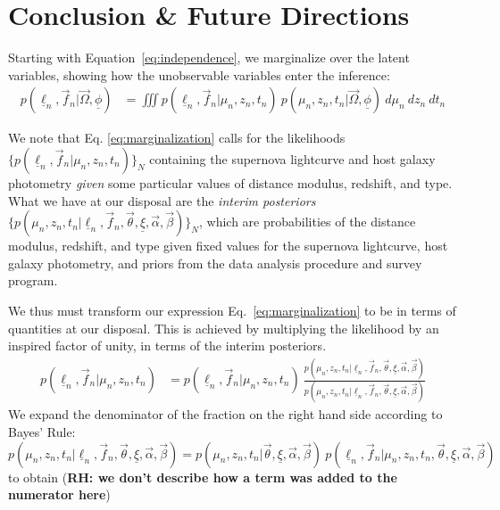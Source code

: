 \documentclass[12pt, twocolumn]{emulateapj}
\newcommand{\textul}{\underline}
\begin{document}
\section{Conclusion \& Future Directions}
\label{sec:conclusion}


\clearpage



\clearpage

\begin{appendix}
\label{appendix:derivation}

Starting with Equation~\ref{eq:independence}, we marginalize over the latent variables, showing how the unobservable variables enter the inference:
\begin{align}
\label{eq:marginalization}
p(\textul{\ell}_{n}, \vec{f}_{n} | \vec{\Omega}, \textul{\phi}) &= \iiint p(\textul{\ell}_{n}, \vec{f}_{n} | \mu_{n}, z_{n}, t_{n})\ p(\mu_{n}, z_{n}, t_{n} | \vec{\Omega}, \textul{\phi})\ d\mu_{n}\ dz_{n}\ dt_{n}
\end{align}
 
  We note that Eq. \ref{eq:marginalization} calls for the likelihoods $\{p(\textul{\ell}_{n}, \vec{f}_{n} | \mu_{n}, z_{n}, t_{n})\}_{N}$ containing the supernova lightcurve and host galaxy photometry \textit{given} some particular values of distance modulus, redshift, and type. 
  What we have at our disposal are the \textit{interim posteriors}  $\{p(\mu_{n}, z_{n}, t_{n} | \textul{\ell}_{n}, \vec{f}_{n}, \vec{\theta}, \textul{\xi}, \vec{\alpha}, \vec{\beta})\}_{N}$, which are probabilities of the distance modulus, redshift, and type given fixed values for the supernova lightcurve, host galaxy photometry, and priors from the data analysis procedure and survey program.

We thus must transform our expression Eq.~\ref{eq:marginalization} to be in terms of quantities at our disposal. 
This is achieved by multiplying the likelihood by an inspired factor of unity, in terms of the interim posteriors.
\begin{align}
\label{eq:unity}
p(\textul{\ell}_{n}, \vec{f}_{n} | \mu_{n}, z_{n}, t_{n}) &= p(\textul{\ell}_{n}, \vec{f}_{n} | \mu_{n}, z_{n}, t_{n})\ \frac{p(\mu_{n}, z_{n}, t_{n} | \textul{\ell}_{n}, \vec{f}_{n},\vec{\theta}, \textul{\xi}, \vec{\alpha}, \vec{\beta})}{p(\mu_{n}, z_{n}, t_{n} | \textul{\ell}_{n}, \vec{f}_{n}, \vec{\theta}, \textul{\xi}, \vec{\alpha}, \vec{\beta})}
\end{align}
We expand the denominator of the fraction on the right hand side according to Bayes' Rule: $p(\mu_{n}, z_{n}, t_{n} | \textul{\ell}_{n}, \vec{f}_{n}, \vec{\theta}, \textul{\xi}, \vec{\alpha}, \vec{\beta}) = p(\mu_{n}, z_{n}, t_{n} | \vec{\theta}, \textul{\xi}, \vec{\alpha}, \vec{\beta})\ p(\textul{\ell}_{n}, \vec{f}_{n} | \mu_{n}, z_{n}, t_{n}, \vec{\theta}, \textul{\xi}, \vec{\alpha}, \vec{\beta})$ to obtain (\textbf{RH: we don't describe how a term was added to the numerator here})


\end{appendix}
\end{document}
